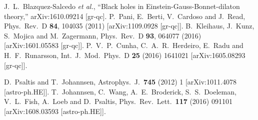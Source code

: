\documentclass[12pt]{article}
\begin{document}
\begin{small}
\begin{thebibliography}{99}
  J.~L.~Blazquez-Salcedo {\it et al.},
   ``Black holes in Einstein-Gauss-Bonnet-dilaton theory,''
  arXiv:1610.09214 [gr-qc].
  P.~Pani, E.~Berti, V.~Cardoso and J.~Read,
  Phys.\ Rev.\ D {\bf 84}, 104035 (2011)
  [arXiv:1109.0928 [gr-qc]].
  B.~Kleihaus, J.~Kunz, S.~Mojica and M.~Zagermann,
  Phys.\ Rev.\ D {\bf 93}, 064077 (2016)
  [arXiv:1601.05583 [gr-qc]].
  P.~V.~P.~Cunha, C.~A.~R.~Herdeiro, E.~Radu and H.~F.~Runarsson,
  Int.\ J.\ Mod.\ Phys.\ D {\bf 25} (2016)   1641021
  [arXiv:1605.08293 [gr-qc]].
 
  D.~Psaltis and T.~Johannsen,
  Astrophys.\ J.\  {\bf 745} (2012) 1
  [arXiv:1011.4078 [astro-ph.HE]].
  T.~Johannsen, C.~Wang, A.~E.~Broderick, S.~S.~Doeleman, V.~L.~Fish, A.~Loeb and D.~Psaltis,
  Phys.\ Rev.\ Lett.\  {\bf 117} (2016)   091101
  [arXiv:1608.03593 [astro-ph.HE]].

	
	

 \end{thebibliography}
 \end{small}

 
\end{document}
